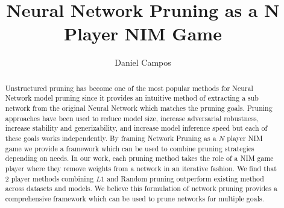 \documentclass[11pt]{article}
\title{Neural Network Pruning as a N Player NIM Game}
\author{Daniel Campos}
\begin{document}
\maketitle
\begin{abstract}
Unstructured pruning has become one of the most popular methods for Neural Network model pruning since it provides an intuitive method of extracting a sub network from the original Neural Network which matches the pruning goals. Pruning approaches have been used to reduce model size, increase adversarial robustness, increase stability and generizability, and increase model inference speed but each of these goals works independently. By framing Network Pruning as a $N$ player NIM game we provide a framework which can be used to combine pruning strategies depending on needs. In our work, each pruning method takes the role of a NIM game player where they remove weights from a network in an iterative fashion. We find that 2 player methods combining $L1$ and Random pruning outperform existing method across datasets and models. We believe this formulation of network pruning provides a comprehensive framework which can be used to prune networks for multiple goals. 
\end{abstract}
\end{document}
